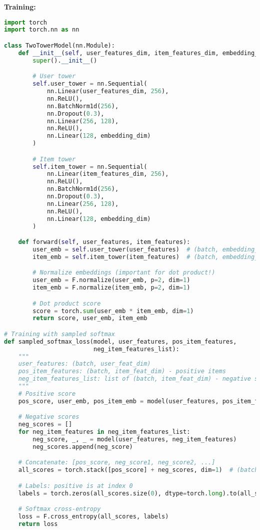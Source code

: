 \documentclass[10pt]{article}
\begin{document}
\textbf{Training:}
\begin{lstlisting}[language=Python]
import torch
import torch.nn as nn

class TwoTowerModel(nn.Module):
    def __init__(self, user_features_dim, item_features_dim, embedding_dim):
        super().__init__()

        # User tower
        self.user_tower = nn.Sequential(
            nn.Linear(user_features_dim, 256),
            nn.ReLU(),
            nn.BatchNorm1d(256),
            nn.Dropout(0.3),
            nn.Linear(256, 128),
            nn.ReLU(),
            nn.Linear(128, embedding_dim)
        )

        # Item tower
        self.item_tower = nn.Sequential(
            nn.Linear(item_features_dim, 256),
            nn.ReLU(),
            nn.BatchNorm1d(256),
            nn.Dropout(0.3),
            nn.Linear(256, 128),
            nn.ReLU(),
            nn.Linear(128, embedding_dim)
        )

    def forward(self, user_features, item_features):
        user_emb = self.user_tower(user_features)  # (batch, embedding_dim)
        item_emb = self.item_tower(item_features)  # (batch, embedding_dim)

        # Normalize embeddings (important for dot product!)
        user_emb = F.normalize(user_emb, p=2, dim=1)
        item_emb = F.normalize(item_emb, p=2, dim=1)

        # Dot product score
        score = torch.sum(user_emb * item_emb, dim=1)
        return score, user_emb, item_emb

# Training with sampled softmax
def sampled_softmax_loss(model, user_features, pos_item_features,
                         neg_item_features_list):
    """
    user_features: (batch, user_feat_dim)
    pos_item_features: (batch, item_feat_dim) - positive items
    neg_item_features_list: list of (batch, item_feat_dim) - negative samples
    """
    # Positive score
    pos_score, user_emb, pos_item_emb = model(user_features, pos_item_features)

    # Negative scores
    neg_scores = []
    for neg_item_features in neg_item_features_list:
        neg_score, _, _ = model(user_features, neg_item_features)
        neg_scores.append(neg_score)

    # Concatenate: [pos_score, neg_score1, neg_score2, ...]
    all_scores = torch.stack([pos_score] + neg_scores, dim=1)  # (batch, 1+num_neg)

    # Labels: positive is at index 0
    labels = torch.zeros(all_scores.size(0), dtype=torch.long).to(all_scores.device)

    # Softmax cross-entropy
    loss = F.cross_entropy(all_scores, labels)
    return loss
\end{lstlisting}
\end{document}

